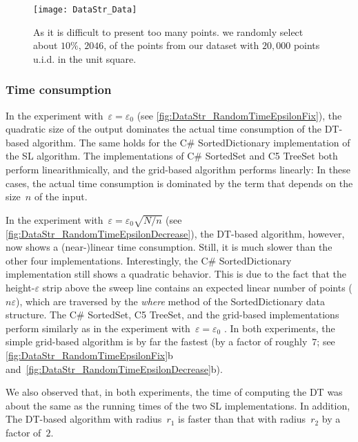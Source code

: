 \begin{figure}[tb]
\centering
\texttt{[image: DataStr\_Data]}
\caption{As it is difficult to present too many points.
	we randomly select about $10\%$, $2046$,
	of the points from our dataset 
	with $20{,}000$ points
	u.i.d. in the unit square.
}
\label{fig:DataStr_RandomData}
\end{figure}

\subsubsection{Time consumption}

In the experiment with~$\varepsilon =\varepsilon_{0}$ 
(see \fig\ref{fig:DataStr_RandomTimeEpsilonFix}), 
the quadratic size of the output dominates the 
actual time consumption of the DT-based algorithm.
The same holds for the C\# SortedDictionary 
implementation of the SL algorithm. 
The implementations of C\# SortedSet and C5 TreeSet  
both perform linearithmically, 
and the grid-based algorithm performs linearly: 
In these cases, the actual time consumption is 
dominated by the term 
that depends on the size~$n$ of the input.


In the experiment with~$\varepsilon =\varepsilon_{0}\sqrt{N/n}$ 
(see \fig\ref{fig:DataStr_RandomTimeEpsilonDecrease}), 
the DT-based algorithm, however, now shows 
a (near-)linear time consumption. 
Still, it is much slower than the other four implementations. 
Interestingly, the C\# SortedDictionary 
implementation still shows a quadratic behavior. 
This is due to the fact 
that the height-$\varepsilon $ strip above the sweep line 
contains an expected linear number of points ($n\varepsilon$), 
which are traversed by the \emph{where} method 
of the SortedDictionary data structure. 
The C\# SortedSet, C5 TreeSet, and the grid-based 
implementations 
perform similarly as in the experiment 
with~$\varepsilon =\varepsilon_{0}$
. In both experiments, the simple grid-based algorithm is by 
far the fastest
(by a factor of roughly~$7$; 
see \figs\ref{fig:DataStr_RandomTimeEpsilonFix}b
and~\ref{fig:DataStr_RandomTimeEpsilonDecrease}b).




We also observed that, in both experiments, 
the time of computing the DT was about 
the same as the running times of 
the two SL implementations. 
In addition, The DT-based 
algorithm with radius~$r_{1}$ is faster than 
that with radius~$r_{2}$ by a factor of~$2$.



